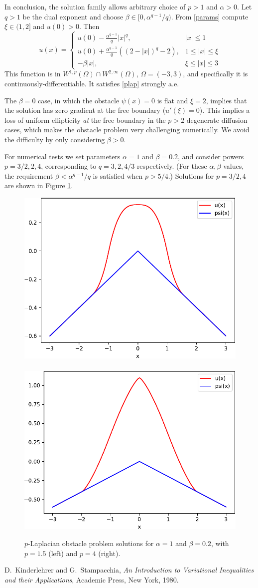 \documentclass[11pt]{amsart}
\begin{document}
In conclusion, the solution family allows arbitrary choice of $p>1$ and $\alpha>0$.  Let $q>1$ be the dual exponent and choose $\beta \in [0,\alpha^{q-1}/q)$.  From \eqref{params} compute $\xi \in (1,2]$ and $u(0)>0$.  Then 
\begin{equation}
\boxed{u(x) = \begin{cases} u(0) - \frac{\alpha^{q-1}}{q} |x|^q, & |x| \le 1 \\
                      u(0) + \frac{\alpha^{q-1}}{q} \left( (2 - |x|)^q - 2 \right), & 1 \le |x| \le \xi \\
                      -\beta |x|, & \xi \le |x| \le 3\end{cases}}  \label{exact}
\end{equation}
This function is in $W^{1,p}(\Omega) \cap W^{2,\infty}(\Omega)$, $\Omega = (-3,3)$, and specifically it is continuously-differentiable.  It satisfies \eqref{plap} strongly a.e.

The $\beta=0$ case, in which the obstacle $\psi(x)=0$ is flat and $\xi=2$, implies that the solution has zero gradient at the free boundary ($u'(\xi)=0$).  This implies a loss of uniform ellipticity \emph{at} the free boundary in the $p>2$ degenerate diffusion cases, which makes the obstacle problem very challenging numerically.  We avoid the difficulty by only considering $\beta>0$.

For numerical tests we set parameters $\alpha=1$ and $\beta = 0.2$, and consider powers $p=3/2,2,4$, corresponding to $q=3,2,4/3$ respectively.  (For these $\alpha,\beta$ values, the requirement $\beta < \alpha^{q-1}/q$ is satisfied when $p > 5/4$.)  Solutions for $p=3/2,4$ are shown in Figure \ref{fig:solutions}.

\begin{figure}
\mbox{\includegraphics[height=0.35\textwidth]{figs/solution1p5.pdf} \qquad \includegraphics[height=0.35\textwidth]{figs/solution4.pdf}}
\caption{$p$-Laplacian obstacle problem solutions for $\alpha=1$ and $\beta=0.2$, with $p=1.5$ (left) and $p=4$ (right).}
\label{fig:solutions}
\end{figure}



\begin{thebibliography}{1}

{\sc D.~Kinderlehrer and G.~Stampacchia}, {\em An {I}ntroduction to
  {V}ariational {I}nequalities and their {A}pplications}, Academic Press, New
  York, 1980.

\end{thebibliography}
\end{document}
